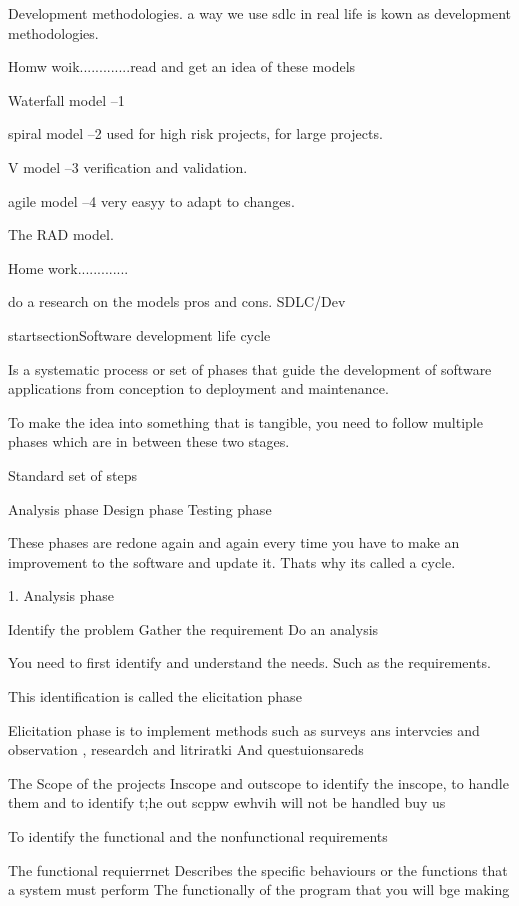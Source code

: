\documentclass[a4paper]{article}
\begin{document}
Development methodologies.
a way we use sdlc in real life is kown as development methodologies.
  

Homw woik.............read and get an idea of these models 

Waterfall model    --1 

spiral model --2 used for high risk projects, for large projects.

V model --3 verification and validation. 

agile model --4 very easyy to adapt to changes.

The RAD model.

Home work.............



do a research on the models pros and cons. 
SDLC/Dev

startsection{Software development life cycle}

Is a systematic process or set of phases that guide the development of software applications from conception to deployment and maintenance.

To make the idea into something that is tangible, you need to follow multiple phases which are in between these two stages.

Standard set of steps 

Analysis phase  
Design phase  
Testing phase 

These phases are redone again and again every time you have to make an improvement to the software and update it. Thats why its called a cycle.

1. Analysis phase 

Identify the problem  
Gather the requirement   
Do an analysis

You need to first identify and understand the needs. Such as the requirements.

This identification is called the elicitation phase

Elicitation phase is to implement methods such as surveys ans intervcies and observation , researdch and litriratki  
And questuionsareds

The Scope of the projects   
	 Inscope and outscope to identify the inscope, to handle them and to identify t;he out scppw ewhvih will not be handled buy us

To identify the functional and the nonfunctional requirements 

The functional requierrnet   
Describes the specific behaviours or the functions that a system must perform  
The functionally of the program that you will bge making 
\end{document}
